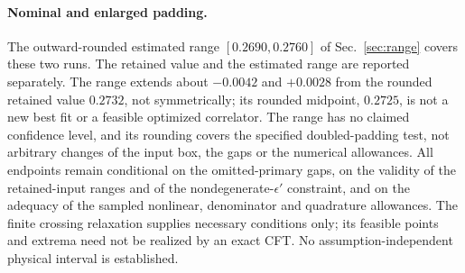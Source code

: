 \documentclass[11pt,a4paper]{article}
\numberwithin{equation}{section}
\begin{document}
\paragraph{Nominal and enlarged padding.} The outward-rounded estimated range $[0.2690,0.2760]$ of Sec.~\ref{sec:range}
covers these two runs. The retained value and the estimated range are reported separately. The range extends about
$-0.0042$ and $+0.0028$ from the rounded retained value $0.2732$, not symmetrically; its rounded midpoint, $0.2725$, is
not a new best fit or a feasible optimized correlator. The range has no claimed confidence level, and its rounding
covers the specified doubled-padding test, not arbitrary changes of the input box, the gaps or the numerical
allowances. All endpoints remain conditional on the omitted-primary gaps, on the validity of the retained-input ranges
and of the nondegenerate-$\epsilon'$ constraint, and on the adequacy of the sampled nonlinear, denominator and
quadrature allowances. The finite crossing relaxation supplies necessary conditions only; its feasible points and
extrema need not be realized by an exact CFT. No assumption-independent physical interval is established.
\end{document}
